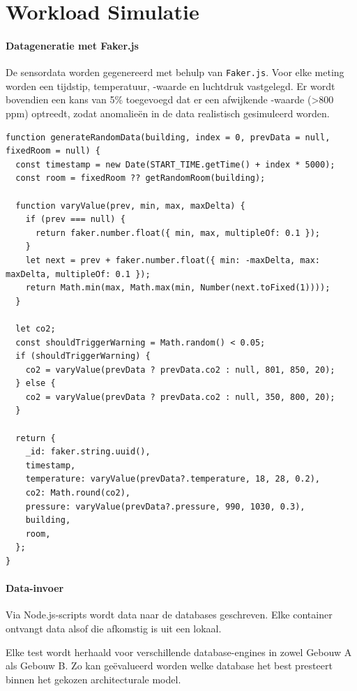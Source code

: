\section{Workload Simulatie}

\paragraph{Datageneratie met Faker.js}
De sensordata worden gegenereerd met behulp van \texttt{Faker.js}. Voor elke meting worden 
een tijdstip, temperatuur, -waarde en luchtdruk vastgelegd. Er wordt bovendien 
een kans van 5\% toegevoegd dat er een afwijkende -waarde (\textgreater 800 ppm) optreedt, 
zodat anomalieën in de data realistisch gesimuleerd worden.

\begin{verbatim}
function generateRandomData(building, index = 0, prevData = null, fixedRoom = null) {
  const timestamp = new Date(START_TIME.getTime() + index * 5000);
  const room = fixedRoom ?? getRandomRoom(building);

  function varyValue(prev, min, max, maxDelta) {
    if (prev === null) {
      return faker.number.float({ min, max, multipleOf: 0.1 });
    }
    let next = prev + faker.number.float({ min: -maxDelta, max: maxDelta, multipleOf: 0.1 });
    return Math.min(max, Math.max(min, Number(next.toFixed(1))));
  }

  let co2;
  const shouldTriggerWarning = Math.random() < 0.05;
  if (shouldTriggerWarning) {
    co2 = varyValue(prevData ? prevData.co2 : null, 801, 850, 20);
  } else {
    co2 = varyValue(prevData ? prevData.co2 : null, 350, 800, 20);
  }

  return {
    _id: faker.string.uuid(),
    timestamp,
    temperature: varyValue(prevData?.temperature, 18, 28, 0.2),
    co2: Math.round(co2),
    pressure: varyValue(prevData?.pressure, 990, 1030, 0.3),
    building,
    room,
  };
}
\end{verbatim}


\paragraph{Data-invoer}
Via Node.js-scripts wordt data naar de databases geschreven. Elke container ontvangt data alsof die afkomstig is uit een lokaal.

Elke test wordt herhaald voor verschillende database-engines in zowel Gebouw A als Gebouw B. Zo kan geëvalueerd worden welke database het best presteert binnen het gekozen architecturale model.


